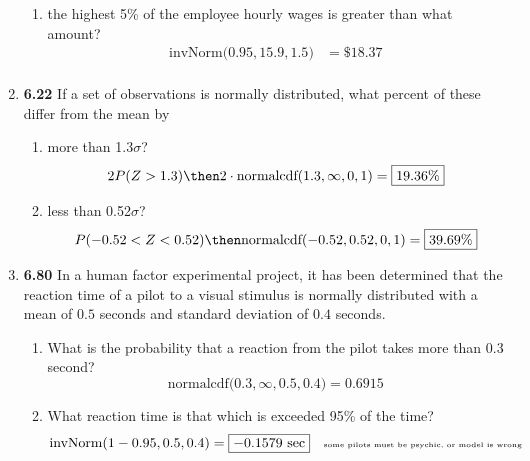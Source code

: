 \documentclass[basic, header]{nosvagor-notes}
\begin{document}
\begin{enumerate}[itemsep=4em]
\begin{enumerate}
      \item the highest 5\% of the employee hourly wages is greater than what amount?
        \begin{align*}
          \text{invNorm($0.95,15.9,1.5$)} &= \boxed{\$18.37} \\
        \end{align*}

    \end{enumerate}

  \item \textbf{6.22} If a set of observations is normally distributed, what
    percent of these differ from the mean by
    \begin{enumerate}

      \item more than 1.3\(\sigma\)?
        \[%
        2P(Z > 1.3) \then
        2 \cdot \text{normalcdf($1.3,\infty,0,1$)} = \boxed{19.36\%}
        \]%

      \item less than 0.52\(\sigma\)?
        \[%
        P(-0.52 < Z < 0.52) \then
        \text{normalcdf($-0.52,0.52,0,1$)} = \boxed{39.69\%}
        \]%

    \end{enumerate}

  \newpage %

  \item \textbf{6.80} In a human factor experimental project, it has been
    determined that the reaction time of a pilot to a visual stimulus is
    normally distributed with a mean of \(0.5\) seconds and standard
    deviation of \(0.4\) seconds.
    \begin{enumerate}

      \item  What is the probability that a reaction from the pilot takes more
        than 0.3 second?
        \[%
          \text{normalcdf($0.3,\infty,0.5,0.4$)} = \boxed{0.6915}
        \]%

      \item What reaction time is that which is exceeded 95\% of the time?
        \[%
          \text{invNorm($1 - 0.95,0.5,0.4$)} = \boxed{-0.1579 \text{ sec}} \quad \text{\tiny{some pilots must be psychic, or model is wrong}}
        \]%


\end{enumerate}
\end{enumerate}
\end{document}
